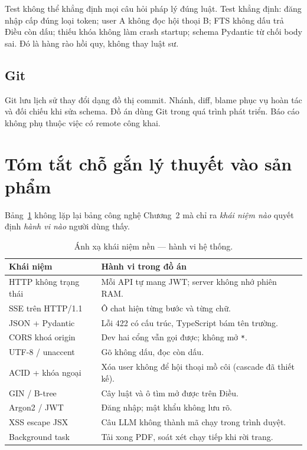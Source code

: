 Test không thể khẳng định mọi câu hỏi pháp lý đúng luật. Test khẳng định: đăng
nhập cấp đúng loại token; user A không đọc hội thoại B; FTS không dấu trả Điều
còn dấu; thiếu khóa không làm crash startup; schema Pydantic từ chối body sai.
Đó là hàng rào hồi quy, không thay luật sư.

\subsection{Git}

Git lưu lịch sử thay đổi dạng đồ thị commit. Nhánh, diff, blame phục vụ hoàn
tác và đối chiếu khi sửa schema. Đồ án dùng Git trong quá trình phát triển. Báo
cáo không phụ thuộc việc có remote công khai.

\section{Tóm tắt chỗ gắn lý thuyết vào sản phẩm}

Bảng~\ref{tab:ly-thuyet-gan} không lặp lại bảng công nghệ Chương~2 mà chỉ ra
\emph{khái niệm nào} quyết định \emph{hành vi nào} người dùng thấy.

\begin{table}[htp]
\centering
\caption{Ánh xạ khái niệm nền --- hành vi hệ thống.}
\label{tab:ly-thuyet-gan}
\begin{tabular}{p{4.2cm}p{9.5cm}}
\toprule
\textbf{Khái niệm} & \textbf{Hành vi trong đồ án} \\
\midrule
HTTP không trạng thái & Mỗi API tự mang JWT; server không nhớ phiên RAM. \\
SSE trên HTTP/1.1 & Ô chat hiện từng bước và từng chữ. \\
JSON + Pydantic & Lỗi 422 có cấu trúc, TypeScript bám tên trường. \\
CORS khoá origin & Dev hai cổng vẫn gọi được; không mở \texttt{*}. \\
UTF-8 / unaccent & Gõ không dấu, đọc còn dấu. \\
ACID + khóa ngoại & Xóa user không để hội thoại mồ côi (cascade đã thiết kế). \\
GIN / B-tree & Cây luật và ô tìm mở được trên \soDieu{} Điều. \\
Argon2 / JWT & Đăng nhập; mật khẩu không lưu rõ. \\
XSS escape JSX & Câu LLM không thành mã chạy trong trình duyệt. \\
Background task & Tải xong PDF, soát xét chạy tiếp khi rời trang. \\
\bottomrule
\end{tabular}
\end{table}
